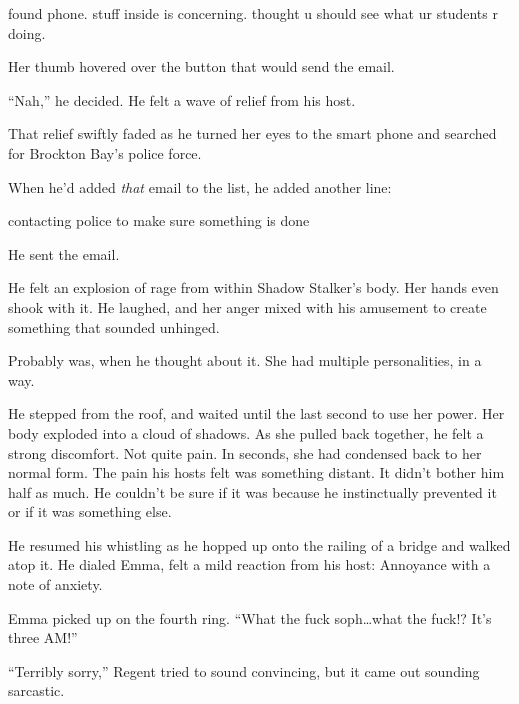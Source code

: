 found phone.  stuff inside is concerning.  thought u should see what ur students r doing.



Her thumb hovered over the button that would send the email.



``Nah,'' he decided.  He felt a wave of relief from his host.



That relief swiftly faded as he turned her eyes to the smart phone and searched for Brockton Bay's police force.



When he'd added \emph{that} email to the list, he added another line:



contacting police to make sure something is done



He sent the email.



He felt an explosion of rage from within Shadow Stalker's body.  Her hands even shook with it.  He laughed, and her anger mixed with his amusement to create something that sounded unhinged.



Probably was, when he thought about it.  She had multiple personalities, in a way.



He stepped from the roof, and waited until the last second to use her power.  Her body exploded into a cloud of shadows.  As she pulled back together, he felt a strong discomfort.  Not quite pain.  In seconds, she had condensed back to her normal form.  The pain his hosts felt was something distant.  It didn't bother him half as much. He couldn't be sure if it was because he instinctually prevented it or if it was something else.



He resumed his whistling as he hopped up onto the railing of a bridge and walked atop it.  He dialed Emma, felt a mild reaction from his host: Annoyance with a note of anxiety.



Emma picked up on the fourth ring.  ``What the fuck soph\ldots what the fuck!?  It's three AM!''



``Terribly sorry,'' Regent tried to sound convincing, but it came out sounding sarcastic.



